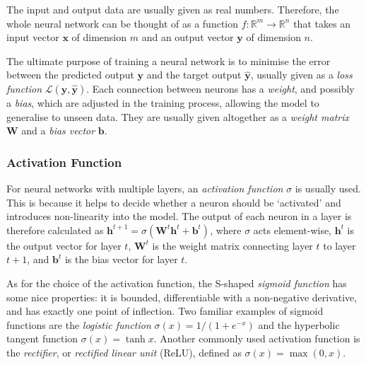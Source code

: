 \documentclass[a4paper,11pt,titlepage]{article}
\theoremstyle{definition}
\theoremstyle{plain}
\theoremstyle{remark}
\begin{document}
The input and output data are usually given as real numbers. Therefore, the whole neural network can be thought of as a function $f:\mathbb{R}^m\rightarrow\mathbb{R}^n$ that takes an input vector $\mathbf{x}$ of dimension $m$ and an output vector $\mathbf{y}$ of dimension $n$.

The ultimate purpose of training a neural network is to minimise the error between the predicted output $\mathbf{y}$ and the target output $\mathbf{\hat{y}}$, usually given as a \textit{loss function} $\mathcal{L}(\mathbf{y}, \mathbf{\hat{y}})$. Each connection between neurons has a \textit{weight}, and possibly a \textit{bias}, which are adjusted in the training process, allowing the model to generalise to unseen data. They are usually given altogether as a \textit{weight matrix} $\mathbf{W}$ and a \textit{bias vector} $\mathbf{b}$.

\subsubsection{Activation Function}

For neural networks with multiple layers, an \textit{activation function} $\sigma$ is usually used. This is because it helps to decide whether a neuron should be ‘activated’ and introduces non-linearity into the model. The output of each neuron in a layer is therefore calculated as $\mathbf{h}^{t+1}=\sigma\left(\mathbf{W}^t\mathbf{h}^t+\mathbf{b}^t\right)$, where $\sigma$ acts element-wise, $\mathbf{h}^t$ is the output vector for layer $t$, $\mathbf{W}^t$ is the weight matrix connecting layer $t$ to layer $t+1$, and $\mathbf{b}^t$ is the bias vector for layer $t$. 

As for the choice of the activation function, the S-shaped \textit{sigmoid function} has some nice properties: it is bounded, differentiable with a non-negative derivative, and has exactly one point of inflection. Two familiar examples of sigmoid functions are the \textit{logistic function} $\sigma(x)=1/\left(1+e^{-x}\right)$ and the hyperbolic tangent function $\sigma(x)=\tanh x$. Another commonly used activation function is the \textit{rectifier}, or \textit{rectified linear unit} (ReLU), defined as $\sigma(x)=\max(0, x)$.
\end{document}
